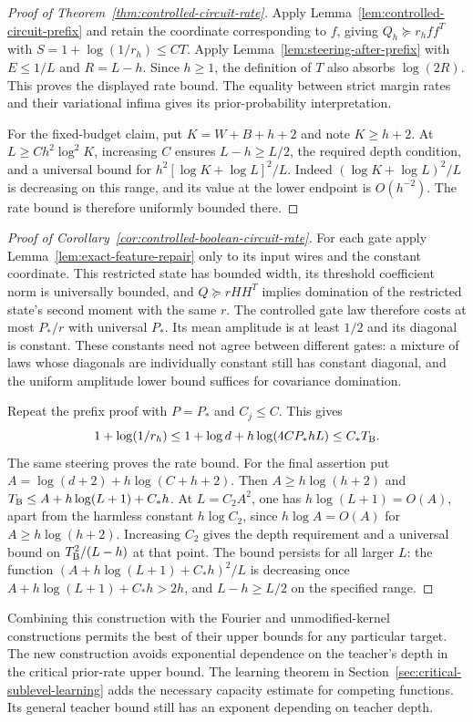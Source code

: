 \begin{proof}[Proof of Theorem~\ref{thm:controlled-circuit-rate}]
Apply Lemma~\ref{lem:controlled-circuit-prefix} and retain the coordinate
corresponding to $f$, giving $Q_h\succeq r_hff^T$ with
$S=1+\log(1/r_h)\le CT$. Apply
Lemma~\ref{lem:steering-after-prefix} with $E\le1/L$ and $R=L-h$.
Since $h\ge1$, the definition of $T$ also absorbs $\log(2R)$.
This proves the displayed rate bound. The equality between strict
margin rates and their variational infima gives its prior-probability
interpretation.

For the fixed-budget claim, put $K=W+B+h+2$ and note $K\ge h+2$.
At $L\ge C h^2\log^2K$, increasing $C$ ensures $L-h\ge L/2$,
the required depth condition, and a universal bound for
$h^2[\log K+\log L]^2/L$.
Indeed $(\log K+\log L)^2/L$ is decreasing on this range, and its
value at the lower endpoint is $O(h^{-2})$.
The rate bound is therefore uniformly bounded there.
\end{proof}

\begin{proof}[Proof of Corollary~\ref{cor:controlled-boolean-circuit-rate}]
For each gate apply Lemma~\ref{lem:exact-feature-repair} only to its
input wires and the constant coordinate. This restricted state has
bounded width, its threshold coefficient norm is universally bounded,
and $Q\succeq rHH^T$ implies domination of the restricted state's
second moment with the same $r$.
The controlled gate law therefore costs at most $P_*/r$ with universal
$P_*$. Its mean amplitude is at least $1/2$ and its diagonal is constant.
These constants need not agree between different gates: a mixture of
laws whose diagonals are individually constant still has constant
diagonal, and the uniform amplitude lower bound suffices for covariance
domination.

Repeat the prefix proof with $P=P_*$ and $C_j\le C$. This gives
\[
 1+\log(1/r_h)
 \le1+\log d+h\log(4CP_*hL)\le C_*T_{\rm B}.
\]
The same steering proves the rate bound.
For the final assertion put
$A=\log(d+2)+h\log(C+h+2)$. Then $A\ge h\log(h+2)$ and
$T_{\rm B}\le A+h\log(L+1)+C_*h$.
At $L=C_2A^2$, one has $h\log(L+1)=O(A)$, apart from the harmless
constant $h\log C_2$, since $h\log A=O(A)$ for
$A\ge h\log(h+2)$. Increasing $C_2$ gives the depth requirement
and a universal bound on $T_{\rm B}^2/(L-h)$ at that point.
The bound persists for all larger $L$: the function
$(A+h\log(L+1)+C_*h)^2/L$ is decreasing once
$A+h\log(L+1)+C_*h>2h$, and $L-h\ge L/2$ on the specified range.
\end{proof}

Combining this construction with the Fourier and unmodified-kernel
constructions permits the best of their upper bounds for any particular
target. The new construction avoids exponential dependence on the
teacher's depth in the critical prior-rate upper bound. The learning theorem in Section~\ref{sec:critical-sublevel-learning}
adds the necessary capacity estimate for competing functions. Its
general teacher bound still has an exponent depending on teacher depth.
